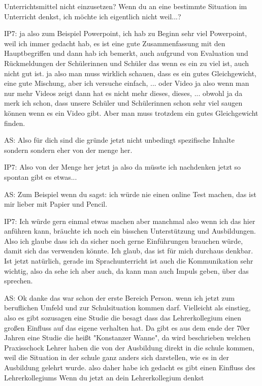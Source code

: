 \documentclass[fontsize=11pt,paper=a4]{scrbook}
\begin{document}
{\begin{itemize*}
Unterrichtsmittel nicht einzusetzen? Wenn du an eine bestimmte Situation im Unterricht
denkst, ich möchte ich eigentlich nicht weil...?
\item[IP7:] ja also zum Beispiel Powerpoint, ich hab zu Beginn sehr viel Powerpoint, weil ich immer gedacht
hab, es ist eine gute Zusammenfassung mit den Hauptbegriffen und dann hab ich bemerkt, auch aufgrund von Evaluation und
Rückmeldungen der Schülerinnen und
Schüler das wenn es ein zu viel ist, auch
nicht gut ist. ja also man muss wirklich
schauen, dass es ein gutes Gleichgewicht,
eine gute Mischung, aber ich versuche
einfach, ... oder Video ja also wenn man
nur mehr Videos zeigt dann hat es nicht mehr dieses, dieses, ... obwohl ja da merk ich 
schon, dass unsere Schüler und
Schülerinnen schon sehr viel saugen
können wenn es ein Video gibt. Aber man
muss trotzdem ein gutes Gleichgewicht
finden.
\item[AS:] Also für dich sind die gründe
jetzt nicht unbedingt spezifische
Inhalte sondern sondern eher von der
menge her.
\item[IP7:] Also von der Menge her jetzt ja also da
müsste ich nachdenken jetzt so spontan
gibt es etwas...
\item[AS:] Zum Beispiel wenn du sagst:
ich würde nie einen online Test machen, das ist mir lieber mit Papier und Pencil.
\item[IP7:] Ich würde gern einmal etwas
machen aber manchmal also wenn ich das
hier anführen kann, bräuchte ich noch ein
bisschen Unterstützung und Ausbildungen. Also
ich glaube dass ich da sicher noch gerne Einführungen brauchen würde,
damit sich das verwenden könnte. Ich glaub, das ist
für mich durchaus denkbar. Ist jetzt
natürlich, gerade im
Sprachunterricht ist auch die
Kommunikation sehr wichtig, also da sehe ich aber auch, da kann man auch Impuls geben, über das sprechen.
\item[AS:] Ok danke das war schon der erste Bereich
Person. wenn ich jetzt zum beruflichen
Umfeld und zur Schulsituation kommen
darf. Vielleicht als einstieg, also es
gibt sozusagen eine Studie die besagt dass das Lehrerkollegium einen
großen Einfluss auf das eigene verhalten
hat. Da gibt es aus dem ende der 70er
Jahren eine Studie die heißt "Konstanzer
Wanne", da wird beschrieben welchen
Praxisschock Lehrer  haben die
von der Ausbildung direkt in die schule
kommen, weil die Situation in der schule
ganz anders sich darstellen, wie es in
der Ausbildung gelehrt wurde. also daher habe ich gedacht es gibt
einen Einfluss des Lehrerkollegiums Wenn
du jetzt an dein Lehrerkollegium denkst

\end{itemize*}}
\end{document}
